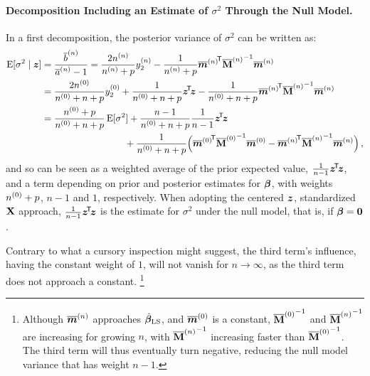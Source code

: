 \paragraph{Decomposition Including an Estimate of \texorpdfstring{$\sigma^2$}{sigma2} Through the Null Model.}

In a first decomposition, the posterior variance of $\sigma^2$ can be written as:
\begin{align}
\E[\sigma^2\mid \z] &= \frac{\tbn}{\tan - 1} %
                     = \frac{2 \nn}{\nn + p} \yn_2 - \frac{1}{\nn + p} {\tmn}^\tra {\tMn}^{-1} \tmn \nonumber\\
                    &= \frac{2 \nz}{\nz + n + p} \yz_2
                     + \frac{1}{\nz + n + p} \ztz
                     - \frac{1}{\nz + n + p} {\tmn}^\tra {\tMn}^{-1} \tmn \nonumber\\
                    &= \frac{\nz + p}{\nz + n + p} \E[\sigma^2]
                         + \frac{n-1}{\nz + n + p} \frac{1}{n-1} \ztz \nonumber\\ & \hspace*{20.6ex}
                         +   \frac{1}{\nz + n + p} \Big( {\tmz}^\tra {\tMz}^{-1} \tmz
                                                       - {\tmn}^\tra {\tMn}^{-1} \tmn \Big)\,,
\label{equ:cccp-sigma1}
%
\end{align}
and so can be seen as a weighted average of the prior expected value,
$\frac{1}{n-1}{\bm z}^{{\mbox{\!\scriptsize\textsf{T}}}} \! {\bm z}$, and a term depending on %
prior and posterior estimates for $\boldsymbol{\beta}$, with weights $n^{(0)} + p$, $n-1$ and $1$, respectively.
When adopting the centered ${\bm z}$, standardized $\mathbf{X}$ approach,
$\frac{1}{n-1}{\bm z}^{{\mbox{\!\scriptsize\textsf{T}}}} \! {\bm z}$ is the estimate for $\sigma^2$ under the null model, that is, if $\boldsymbol{\beta} = {\bm0}$.

Contrary to what a cursory inspection might suggest,
the third term's influence, having the constant weight of $1$,
will not vanish for $n \to \infty$, %
as the third term does not approach a constant.%
\footnote{Although $\overline{{\bm m}}^{(n)}$ approaches $\hat{\boldsymbol{\beta}}_\text{LS}$, and $\overline{{\bm m}}^{(0)}$ is a constant,
${\overline{\mathbf{M}}^{(0)}}^{-1}$ and ${\overline{\mathbf{M}}^{(n)}}^{-1}$ are increasing for growing $n$,
with ${\overline{\mathbf{M}}^{(n)}}^{-1}$ increasing faster than ${\overline{\mathbf{M}}^{(0)}}^{-1}$.
The third term will thus eventually turn negative, reducing the null model variance that has weight $n-1$.}

